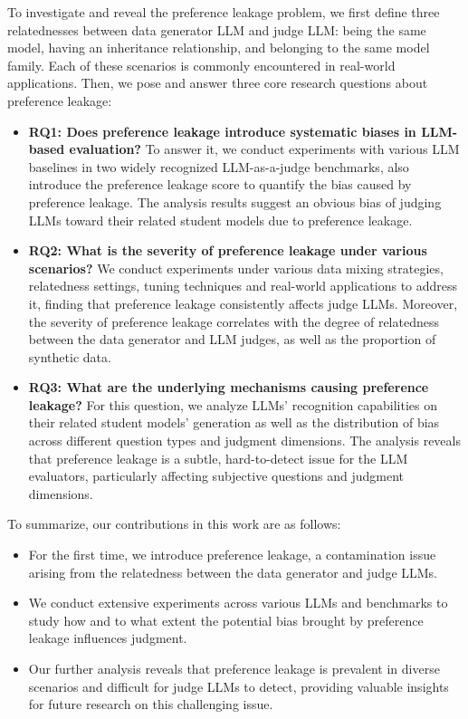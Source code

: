 \documentclass{article} %
\begin{document}
To investigate and reveal the preference leakage problem, we first define three relatednesses between data generator LLM and judge LLM: being the same model, having an inheritance relationship, and belonging to the same model family. Each of these scenarios is commonly encountered in real-world applications. Then, we pose and answer three core research questions about preference leakage:


\begin{itemize}[leftmargin=*,itemsep=1pt]
    \vspace{-2mm}
    \item \textbf{RQ1: Does preference leakage introduce systematic biases in LLM-based evaluation?} To answer it, we conduct experiments with various LLM baselines in two widely recognized LLM-as-a-judge benchmarks, also introduce the preference leakage score to quantify the bias caused by preference leakage. The analysis results suggest an obvious bias of judging LLMs toward their related student models due to preference leakage.
    \vspace{-1mm}
    \item \textbf{RQ2: What is the severity of preference leakage under various scenarios?} We conduct experiments under various data mixing strategies, relatedness settings, tuning techniques and real-world applications to address it, finding that preference leakage consistently affects judge LLMs. Moreover, the severity of preference leakage correlates with the degree of relatedness between the data generator and LLM judges, as well as the proportion of synthetic data.
    \vspace{-1mm}
    \item \textbf{RQ3: What are the underlying mechanisms causing preference leakage?} For this question, we analyze LLMs' recognition capabilities on their related student models' generation as well as the distribution of bias across different question types and judgment dimensions. The analysis reveals that preference leakage is a subtle, hard-to-detect issue for the LLM evaluators, particularly affecting subjective questions and judgment dimensions.
\end{itemize}


To summarize, our contributions in this work are as follows:
\begin{itemize}[leftmargin=*,itemsep=1pt]
    \vspace{-1mm}
    \item For the first time, we introduce preference leakage, a contamination issue arising from the relatedness between the data generator and judge LLMs.
    \vspace{-1mm}
    \item We conduct extensive experiments across various LLMs and benchmarks to study how and to what extent the potential bias brought by preference leakage influences judgment.
    \vspace{-1mm}
    \item Our further analysis reveals that preference leakage is prevalent in diverse scenarios and difficult for judge LLMs to detect, providing valuable insights for future research on this challenging issue.
\end{itemize}
\end{document}
